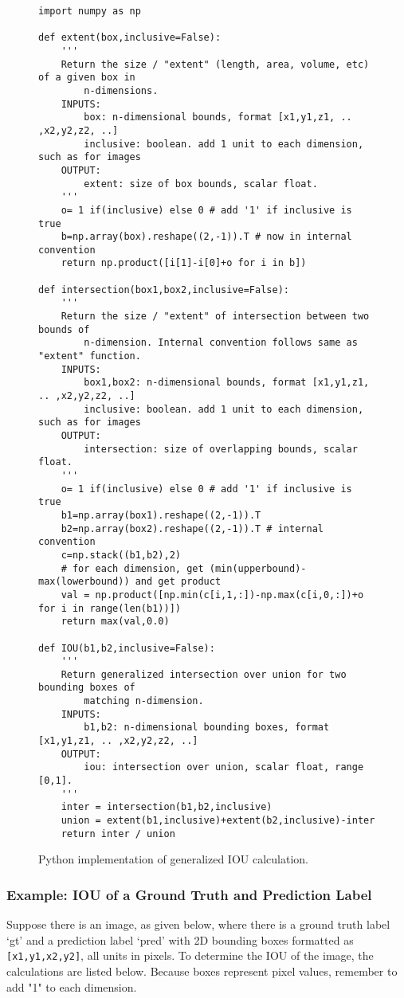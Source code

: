 \begin{figure}[H]
\begin{lstlisting}
import numpy as np

def extent(box,inclusive=False):
    '''
    Return the size / "extent" (length, area, volume, etc) of a given box in
        n-dimensions.
    INPUTS:
        box: n-dimensional bounds, format [x1,y1,z1, .. ,x2,y2,z2, ..]
        inclusive: boolean. add 1 unit to each dimension, such as for images
    OUTPUT:
        extent: size of box bounds, scalar float.
    '''
    o= 1 if(inclusive) else 0 # add '1' if inclusive is true
    b=np.array(box).reshape((2,-1)).T # now in internal convention
    return np.product([i[1]-i[0]+o for i in b])

def intersection(box1,box2,inclusive=False):
    '''
    Return the size / "extent" of intersection between two bounds of
        n-dimension. Internal convention follows same as "extent" function.
    INPUTS:
        box1,box2: n-dimensional bounds, format [x1,y1,z1, .. ,x2,y2,z2, ..]
        inclusive: boolean. add 1 unit to each dimension, such as for images
    OUTPUT:
        intersection: size of overlapping bounds, scalar float.
    '''
    o= 1 if(inclusive) else 0 # add '1' if inclusive is true
    b1=np.array(box1).reshape((2,-1)).T
    b2=np.array(box2).reshape((2,-1)).T # internal convention
    c=np.stack((b1,b2),2)
    # for each dimension, get (min(upperbound)-max(lowerbound)) and get product
    val = np.product([np.min(c[i,1,:])-np.max(c[i,0,:])+o for i in range(len(b1))])
    return max(val,0.0)

def IOU(b1,b2,inclusive=False):
    '''
    Return generalized intersection over union for two bounding boxes of 
        matching n-dimension.
    INPUTS:
        b1,b2: n-dimensional bounding boxes, format [x1,y1,z1, .. ,x2,y2,z2, ..]
    OUTPUT:
        iou: intersection over union, scalar float, range [0,1].
    '''
    inter = intersection(b1,b2,inclusive)
    union = extent(b1,inclusive)+extent(b2,inclusive)-inter
    return inter / union

\end{lstlisting}
\onehalfspacing %
\caption{Python implementation of generalized IOU calculation.}
\label{code_iou}
\end{figure}

\subsubsection{Example: IOU of a Ground Truth and Prediction Label}
Suppose there is an image, as given below, where there is a ground truth label `gt' and a prediction label `pred' with 2D bounding boxes formatted as \texttt{[x1,y1,x2,y2]}, all units in pixels. To determine the IOU of the image, the calculations are listed below. Because boxes represent pixel values, remember to add "1" to each dimension.



